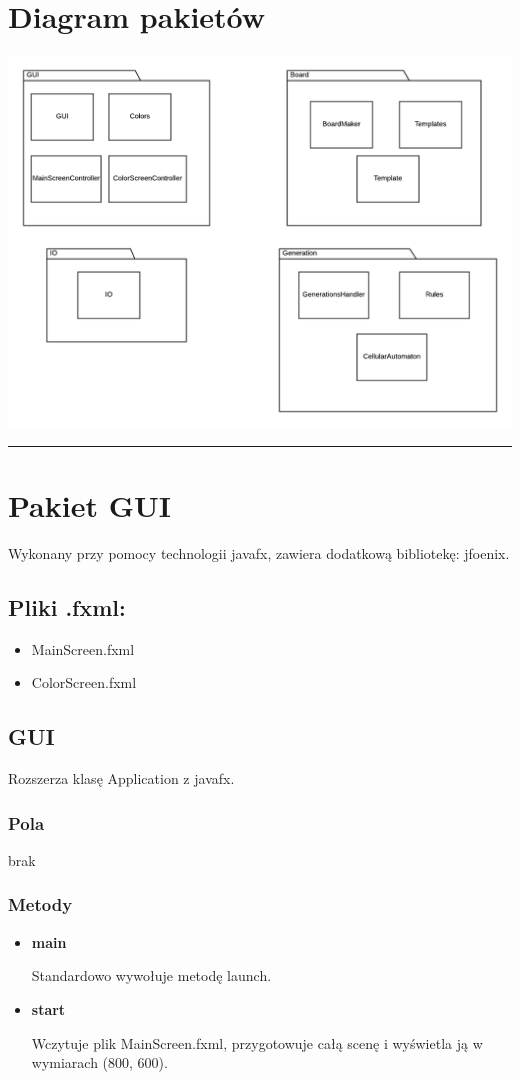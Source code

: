 \documentclass[a4paper,11pt]{article}
\newcommand{\linia}{\rule{\linewidth}{0.4mm}}
\begin{document}
\section{Diagram pakietów}
\includegraphics[width=\textwidth]{DiagramPakiet}







\noindent\linia
\section{Pakiet GUI}

Wykonany przy pomocy technologii javafx, zawiera dodatkową bibliotekę: jfoenix.

\subsection{Pliki .fxml:}
\begin{itemize}
\item MainScreen.fxml
\item ColorScreen.fxml
\end{itemize}

\subsection{GUI}
Rozszerza klasę Application z javafx.
\subsubsection{Pola}
brak
\subsubsection{Metody}
\begin{itemize}
\item \textbf{main}

Standardowo wywołuje metodę launch.
\item \textbf{start}

Wczytuje plik MainScreen.fxml, przygotowuje całą scenę i wyświetla ją w wymiarach (800, 600).
\end{itemize}
\end{document}
